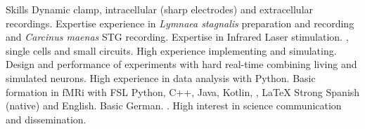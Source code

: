 \begin{rubric}{Skills}
	Dynamic clamp, intracellular (sharp electrodes) and extracellular recordings. Expertise experience in \textit{Lymnaea stagnalis} preparation and recording and \textit{Carcinus maenas} STG recording.
    \large{Expertise in Infrared Laser stimulation}.
, single cells and small circuits. High experience implementing and simulating.
 Design and performance of experiments with hard real-time combining living and simulated neurons. 
    High experience in data analysis with Python. 
    Basic formation in fMRi with FSL
	Python, C++, Java, Kotlin, , \LaTeX
{}
	Strong Spanish (native) and English. Basic German.
. High interest in science communication and dissemination.

\end{rubric}
